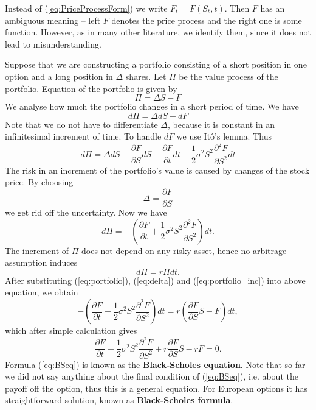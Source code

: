 \documentclass[a4paper,11pt, twoside]{book}
\theoremstyle{definition}
\theoremstyle{remark}
\begin{document}
Instead of (\ref{eq:PriceProcessForm}) we write $F_t = F(S_t, t)$. Then $F$ has an ambiguous meaning -- left $F$ denotes the price process and the right one is some function. However, as in many other literature, we identify them, since it does not lead to misunderstanding.

Suppose that we are constructing a portfolio consisting of a short position in one option and a long position in $\Delta$ shares. Let $\Pi$ be the value process of the portfolio. Equation of the portfolio is given by
\begin{equation}
 \label{eq:portfolio}
  \Pi = \Delta S - F 
\end{equation}
We analyse how much the portfolio changes in a short period of time. We have
\[ d\Pi = \Delta dS - dF  \]
Note that we do not have to differentiate $\Delta$, because it is constant in an infinitesimal increment of time. To handle $dF$ we use It\^{o}'s lemma. Thus
\[ d\Pi = \Delta dS - \frac{\partial F}{\partial S}dS - \frac{\partial F}{\partial t}dt - \frac{1}{2}\sigma^2 S^2 \frac{\partial^2 F}{\partial S^2}dt  \]
The risk in an increment of the portfolio's value is caused by changes of the stock price. By choosing
\begin{equation}
 \label{eq:delta}
 \Delta = \frac{\partial F}{\partial S}
\end{equation}
we get rid off the uncertainty. Now we have
\begin{equation}
  \label{eq:portfolio_inc}
 d\Pi = -(\frac{\partial F}{\partial t} + \frac{1}{2}\sigma^2 S^2 \frac{\partial^2 F}{\partial S^2})dt.
\end{equation}
The increment of $\Pi$ does not depend on any risky asset, hence no-arbitrage assumption induces
\[ d\Pi = r\Pi dt. \]
After substituting (\ref{eq:portfolio}), (\ref{eq:delta}) and (\ref{eq:portfolio_inc}) into above equation, we obtain
\[ -(\frac{\partial F}{\partial t} + \frac{1}{2}\sigma^2 S^2 \frac{\partial^2 F}{\partial S^2})dt = r(\frac{\partial F}{\partial S} S - F)dt, \]
which after simple calculation gives
\begin{equation}
 \label{eq:BSeq}
 \frac{\partial F}{\partial t} + \frac{1}{2}\sigma^2 S^2 \frac{\partial^2 F}{\partial S^2} + r\frac{\partial F}{\partial S} S - rF = 0.
\end{equation}
Formula (\ref{eq:BSeq}) is known as the \textbf{Black-Scholes equation}. Note that so far we did not say anything about the final condition of (\ref{eq:BSeq}), i.e. about the payoff off the option, thus this is a general equation. For European options it has straightforward solution, known as \textbf{Black-Scholes formula}.
\end{document}
